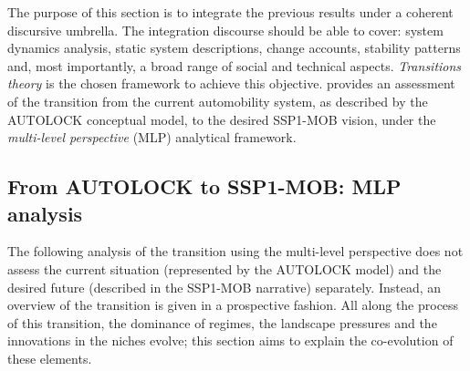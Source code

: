 %
%
%
The purpose of this section is to integrate the previous results under a coherent discursive umbrella. The integration discourse should be able to cover: system dynamics analysis, static system descriptions, change accounts, stability patterns and, most importantly, a broad range of social and technical aspects. \emph{Transitions theory} is the chosen framework to achieve this objective.  provides an assessment of the transition from the current automobility system, as described by the AUTOLOCK conceptual model, to the desired SSP1-MOB vision, under the \emph{multi-level perspective} (MLP) analytical framework.%

\subsection{From AUTOLOCK to SSP1-MOB: MLP analysis}
\label{ss:results:transition_mlp}
%
The following analysis of the transition using the multi-level perspective does not assess the current situation (represented by the AUTOLOCK model) and the desired future (described in the SSP1-MOB narrative) separately. Instead, an overview of the transition is given in a prospective fashion. All along the process of this transition, the dominance of regimes, the landscape pressures and the innovations in the niches evolve; this section aims to explain the co-evolution of these elements.

